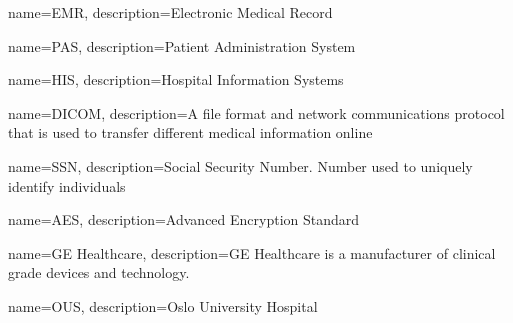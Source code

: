 {
    name=EMR,
    description={Electronic Medical Record}
}

{
    name=PAS,
    description={Patient Administration System}
}

{
    name=HIS,
    description={Hospital Information Systems}
}

{
    name=DICOM,
    description={A file format and network communications protocol that is used to transfer different medical information online}
}

{
    name=SSN,
    description={Social Security Number. Number used to uniquely identify individuals}
}

{
    name=AES,
    description={Advanced Encryption Standard}
}

{
    name=GE Healthcare,
    description={GE Healthcare is a manufacturer of clinical grade devices and technology.}
}

{
    name=OUS,
    description={Oslo University Hospital}
}